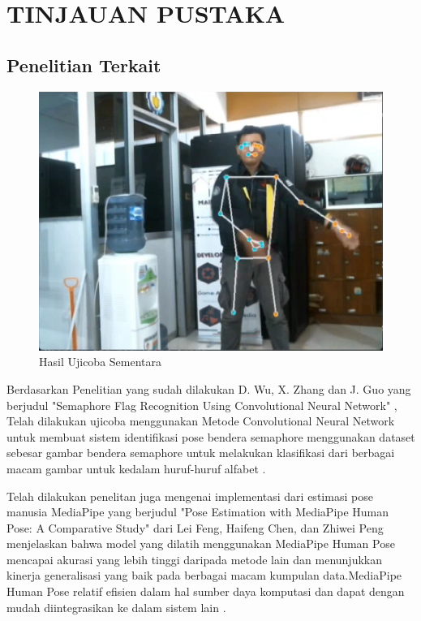 \section{TINJAUAN PUSTAKA}


\subsection{Penelitian Terkait}
\begin{figure} [ht] \centering
    \includegraphics[scale=0.5]{gambar/contoh.png}
    \caption{Hasil Ujicoba Sementara}
    \label{fig:Ujicoba Sementara}
  \end{figure}

Berdasarkan Penelitian yang sudah dilakukan D. Wu, X. Zhang dan J. Guo yang berjudul "Semaphore Flag Recognition Using Convolutional Neural Network" , Telah dilakukan ujicoba menggunakan Metode Convolutional Neural Network untuk membuat sistem identifikasi pose bendera semaphore menggunakan dataset sebesar gambar bendera semaphore untuk melakukan klasifikasi dari berbagai macam gambar untuk kedalam huruf-huruf alfabet 
\parencite{SemaphoreFlagCNN}. 

Telah dilakukan penelitan juga mengenai implementasi dari estimasi pose manusia MediaPipe yang berjudul "Pose Estimation with MediaPipe Human Pose: A Comparative Study" dari Lei Feng, Haifeng Chen, dan Zhiwei Peng menjelaskan bahwa model yang dilatih menggunakan MediaPipe Human Pose mencapai akurasi yang lebih tinggi daripada metode lain dan menunjukkan kinerja generalisasi yang baik pada berbagai macam kumpulan data.MediaPipe Human Pose relatif efisien dalam hal sumber daya komputasi dan dapat dengan mudah diintegrasikan ke dalam sistem lain \parencite{MediaPipe} .


